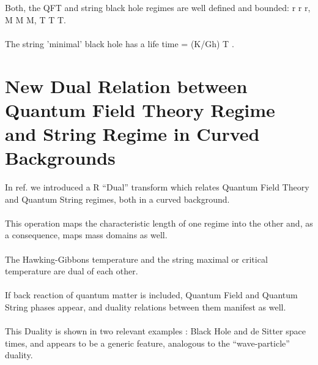 \documentclass[12pt,a4paper]{article}
\begin{document}
Both, the QFT and string black hole regimes are well defined and bounded:  
r\coordHE{} r\myHighlight{$_{+} \le$}\coordHE{} r\coordHE{}, 
M\coordHE{} M\myHighlight{$_{+} \le$}\coordHE{} M\coordHE{}, 
T\coordHE{} T\myHighlight{$_{+} \le$}\coordHE{} T\coordHE{}.\\ \\
The string 'minimal' black hole has a life time 
\coordHE{} = (K/Gh) T\coordHE{}  \coordHE{}. \\
 \section{New Dual Relation between Quantum Field Theory Regime and String 
Regime in Curved Backgrounds}
In ref.\cite{ms3} we introduced a R ``Dual'' transform which relates Quantum Field Theory and 
Quantum String regimes, both in a curved background.\\ \\
This operation maps the characteristic length of one regime into the other 
and, as a consequence, maps mass domains as well.\\ \\
The Hawking-Gibbons temperature and the string maximal or critical temperature 
are dual of each other.\\ \\
If back reaction of quantum matter is included, Quantum Field and Quantum 
String phases appear, and duality relations between them manifest as well.\\ \\
This Duality is shown in two relevant examples : Black Hole and de Sitter space times, and appears to be a generic feature, analogous to the ``wave-particle'' duality.\\
\end{document}
